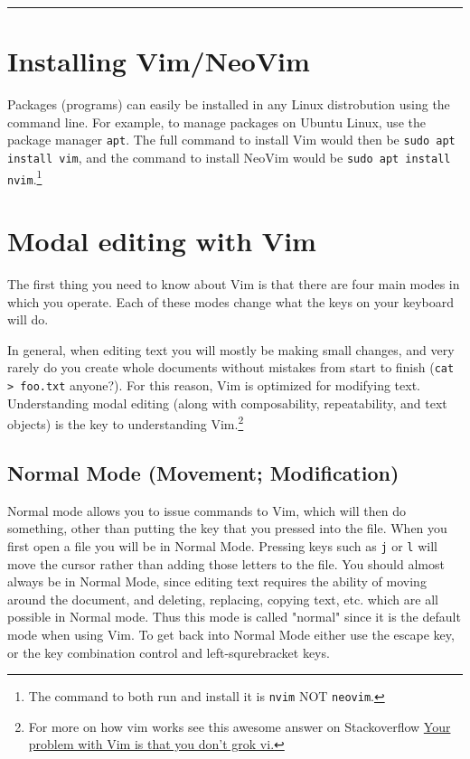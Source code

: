 \documentclass[11pt]{article}
\begin{document}
\noindent\rule{\textwidth}{0.5pt}

\newpage

\section{Installing Vim/NeoVim}
\label{sec:orgf7aa804}
Packages (programs) can easily be installed in any Linux distrobution using the
command line. For example, to manage packages on Ubuntu Linux, use the package
manager \texttt{apt}. The full command to install Vim would then be \texttt{sudo apt install
vim}, and the command to install NeoVim would be \texttt{sudo apt install nvim}.\footnote{The command to both run and install it is \texttt{nvim} NOT \texttt{neovim}.}
\section{Modal editing with Vim}
\label{sec:org08365dd}
The first thing you need to know about Vim is that there are four main modes in
which you operate. Each of these modes change what the keys on your keyboard
will do.

In general, when editing text you will mostly be making small changes, and very
rarely do you create whole documents without mistakes from start to finish (\texttt{cat
> foo.txt} anyone?). For this reason, Vim is optimized for modifying text.
Understanding modal editing (along with composability, repeatability, and text
objects) is the key to understanding Vim.\footnote{For more on how vim works see this awesome answer on Stackoverflow
\href{https://stackoverflow.com/questions/1218390/what-is-your-most-productive-shortcut-with-vim}{Your problem with Vim is that you don't grok vi.}}
\subsection{Normal Mode (Movement; Modification)}
\label{sec:org2b3ba42}
Normal mode allows you to issue commands to Vim, which will then do something,
other than putting the key that you pressed into the file. When you first open a
file you will be in Normal Mode. Pressing keys such as \texttt{j} or \texttt{l} will move the
cursor rather than adding those letters to the file. You should almost always be
in Normal Mode, since editing text requires the ability of moving around the
document, and deleting, replacing, copying text, etc. which are all possible in
Normal mode. Thus this mode is called "normal" since it is the default mode when
using Vim. To get back into Normal Mode either use the escape key, or the key
combination control and left-squrebracket keys.
\end{document}
